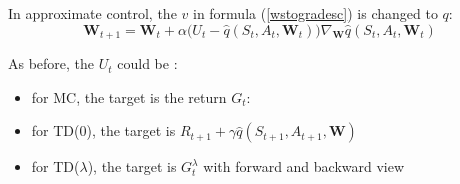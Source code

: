 In approximate control, the $v$ in formula (\ref{wstogradesc}) is changed to $q$:
\begin{equation}
	\mathbf{W}_{t+1} = \mathbf{W}_t+ \alpha \Big ( U_t - \widehat{q}(S_t, A_t, \mathbf{W}_t) \Big ) \nabla_{\mathbf{W}}  \widehat{q}(S_t, A_t, \mathbf{W}_t) 
\end{equation}

As before, the $U_t$ could be : 
\begin{itemize}
	\item for MC, the target is the return $G_t$:
	\item for TD(0), the target is $R_{t+1} + \gamma \widehat{q}(S_{t+1}, A_{t+1}, \mathbf{W} )$
	\item for TD($\lambda$), the target is $G_t^\lambda$ with forward and backward view
\end{itemize}
